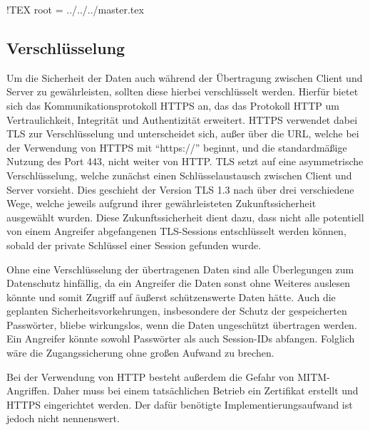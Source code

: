  !TEX root =  ../../../master.tex
\subsection{Verschlüsselung}

Um die Sicherheit der Daten auch während der Übertragung zwischen Client und Server zu gewährleisten, sollten diese hierbei verschlüsselt werden.
Hierfür bietet sich das Kommunikationsprotokoll \acs{HTTPS} an, das das Protokoll \acs{HTTP} um Vertraulichkeit, Integrität und Authentizität erweitert.
\acs{HTTPS} verwendet dabei \acs{TLS} zur Verschlüsselung und unterscheidet sich, außer über die \acs{URL}, welche bei der Verwendung von \acs{HTTPS} mit \enquote{https://} beginnt, und die standardmäßige Nutzung des Port 443, nicht weiter von \acs{HTTP}.
\acs{TLS} setzt auf eine asymmetrische Verschlüsselung, welche zunächst einen Schlüsselaustausch zwischen Client und Server vorsieht.
Dies geschieht der Version \acs{TLS} 1.3 nach über drei verschiedene Wege, welche jeweils aufgrund ihrer gewährleisteten Zukunftssicherheit ausgewählt wurden.
Diese Zukunftssicherheit dient dazu, dass nicht alle potentiell von einem Angreifer abgefangenen \acs{TLS}-Sessions entschlüsselt werden können, sobald der private Schlüssel einer Session gefunden wurde.\autocite{rf-RFC8446}

Ohne eine Verschlüsselung der übertragenen Daten sind alle Überlegungen zum Datenschutz hinfällig, da ein Angreifer die Daten sonst ohne Weiteres auslesen könnte und somit Zugriff auf äußerst schützenswerte Daten hätte.
Auch die geplanten Sicherheitsvorkehrungen, insbesondere der Schutz der gespeicherten Passwörter, bliebe wirkungslos, wenn die Daten ungeschützt übertragen werden.
Ein Angreifer könnte sowohl Passwörter als auch Session-IDs abfangen.
Folglich wäre die Zugangssicherung ohne großen Aufwand zu brechen.

Bei der Verwendung von \acs{HTTP} besteht außerdem die Gefahr von \ac{MITM}-Angriffen.
Daher muss bei einem tatsächlichen Betrieb ein Zertifikat erstellt und \acs{HTTPS} eingerichtet werden.
Der dafür benötigte Implementierungsaufwand ist jedoch nicht nennenswert.
